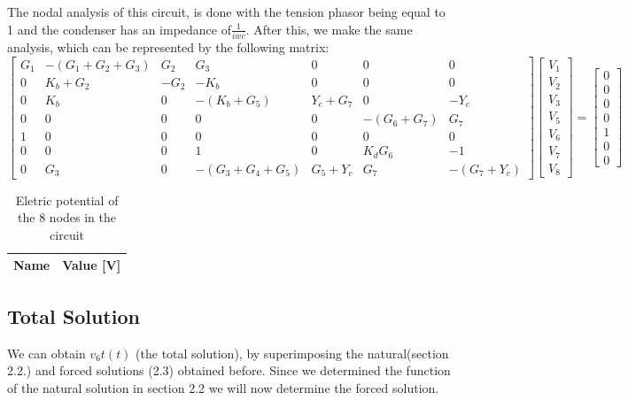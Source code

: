 The nodal analysis of this circuit, is done with the tension phasor being equal to 1 and the condenser has an impedance of$\frac{1}{iwc}$.
After this, we make the same analysis, which can be represented by the following matrix:
\begin{equation*}
	\begin{bmatrix}
		G_1 & -(G_1 + G_2 + G_3) & G_2 & G_3 & 0 & 0 & 0 \\ 
		0 & K_b + G_2 & -G_2 & -K_b & 0 & 0 & 0 \\
		0 & K_b & 0 & -(K_b + G_5) & Y_c + G_7 & 0 & -Y_c \\ 
		0 & 0 & 0 & 0 & 0 & -(G_6 + G_7) & G_7 \\
		1 & 0 & 0 & 0 & 0 & 0 & 0 \\
		0 & 0 & 0 & 1 & 0 & K_dG_6 & -1 \\
		0 & G_3 & 0 & -(G_3 + G_4 + G_5) & G_5 + Y_c & G_7 & -(G_7 + Y_c)
	\end{bmatrix}
	\begin{bmatrix} V_1 \\ V_2 \\ V_3 \\ V_5 \\ V_6 \\ V_7 \\ V_8 
	\end{bmatrix}
	=
	\begin{bmatrix} 0 \\ 0 \\ 0 \\ 0 \\ 1 \\ 0 \\ 0 
	\end{bmatrix}
\end{equation*}

\begin{table}[h!]
	\centering
	\begin{tabular}{|l|r|}
		\hline    
		{\bf Name} & {\bf Value [V]} \\ \hline
		
	\end{tabular}
	\caption{Eletric potential of the 8 nodes in the circuit}
	\label{tab:op}
\end{table}

\subsection{Total Solution}
We can obtain $v_6t(t)$ (the total solution), by superimposing the natural(section 2.2.) and forced solutions (2.3) obtained before. Since we determined the function of the natural solution in section 2.2 we will now determine the forced solution.


